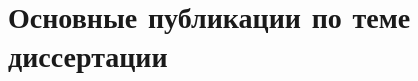 \section*{\centering Основные публикации по теме диссертации}

\nocite{MZG2015, KMU2015, KMU2016, KMU17, MZG2017, Kazan2015, Vest18, Almanac2017}
\nocite{LomRead2014, Bur2014, Lomonosov2014, NeZaTeGiUs2014, Lomonosov2015, Kazan2015conf, Bur2016, LomRead2016, Lomonosov2016, NeZaTeGiUs2016, Lomonosov2017, LomRead2017, Ob2017, Lomonosov2018, NeZaTeGiUs2018}

